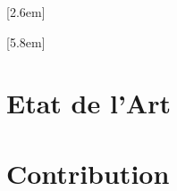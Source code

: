 \documentclass[a4paper,11pt,twoside]{book}
\begin{document}

    [2.6em]                  %
    {\bfseries}              %
    {\contentslabel{2.3em}}  %
    {\hspace*{-2.3em}}
    {\hfill\contentspage}

    [5.8em]
    {}
    {\contentslabel{3.2em}}
    {}
    {\hfill\contentspage}

    \newcommand{\PartialToc}{%
        \vspace*{1pc}\vbox{\textbf{Sommaire}}\vspace*{0.5pc}
        \hrule\vspace*{0.5pc}
        \startcontents[chapters]
        \printcontents[chapters]{p}{1}{}\vspace*{0.5pc}\hrule}
    \cleardoublepage
    \tableofcontents
    \mainmatter
    \part{Etat de l'Art}
    
    
    
    \part{Contribution}
	
	
	
    
    \appendix
    
    \printglossaries
    
    
\end{document}
